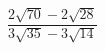\begin{ex}[type=expression]
	\begin{condition}
		\( \dfrac{2\sqrt{70}-2\sqrt{28}}{3\sqrt{35}-3\sqrt{14}} \)
	\end{condition}
\end{ex}